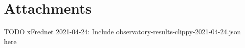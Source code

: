 \section{Attachments}

TODO xFrednet 2021-04-24: Include observatory-results-clippy-2021-04-24.json here \label{att:observatory-results-clippy-2021-04-24}